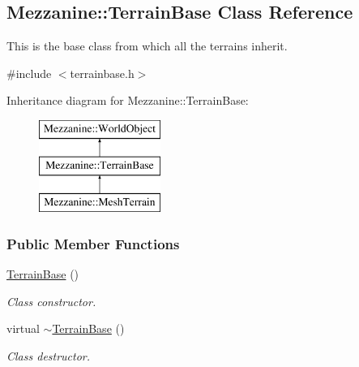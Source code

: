 \hypertarget{classMezzanine_1_1TerrainBase}{
\subsection{Mezzanine::TerrainBase Class Reference}
\label{classMezzanine_1_1TerrainBase}
}


This is the base class from which all the terrains inherit.  




{\ttfamily \#include $<$terrainbase.h$>$}

Inheritance diagram for Mezzanine::TerrainBase:\begin{figure}[H]
\begin{center}
\leavevmode
\includegraphics[height=3.000000cm]{classMezzanine_1_1TerrainBase}
\end{center}
\end{figure}
\subsubsection*{Public Member Functions}
\begin{DoxyCompactItemize}
\item 
\hypertarget{classMezzanine_1_1TerrainBase_acef47cd685e294ce6783cdc5bc4dabfe}{
\hyperlink{classMezzanine_1_1TerrainBase_acef47cd685e294ce6783cdc5bc4dabfe}{TerrainBase} ()}
\label{classMezzanine_1_1TerrainBase_acef47cd685e294ce6783cdc5bc4dabfe}

\begin{DoxyCompactList}\small\item\em Class constructor. \item\end{DoxyCompactList}\item 
\hypertarget{classMezzanine_1_1TerrainBase_a6edbf4c6ec420de9454aded02ca06d1a}{
virtual \hyperlink{classMezzanine_1_1TerrainBase_a6edbf4c6ec420de9454aded02ca06d1a}{$\sim$TerrainBase} ()}
\label{classMezzanine_1_1TerrainBase_a6edbf4c6ec420de9454aded02ca06d1a}

\begin{DoxyCompactList}\small\item\em Class destructor. \item\end{DoxyCompactList}\end{DoxyCompactItemize}


